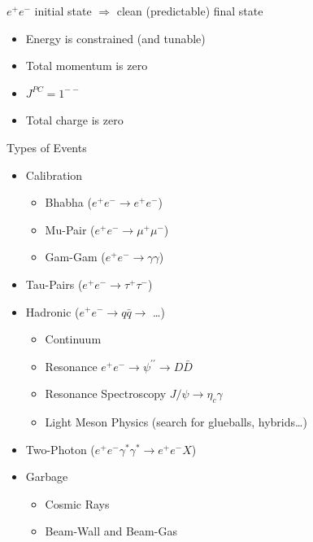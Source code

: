 \begin{slide*}
\slideframe{}
\begin{minipage}[t]{\linewidth}
\vspace{0.2 cm}

\begin{center}
  \begin{minipage}{0.9\linewidth}

    \large
     $e^+ e^-$ initial state $\Longrightarrow$ clean (predictable) final state
     \begin{itemize}
       \item Energy is constrained (and tunable)
       \item Total momentum is zero
       \item $J^{PC} = 1^{--}$
       \item Total charge is zero
     \end{itemize}

    \Large
    \vspace{0.2 cm}
    Types of Events
    \begin{itemize}

      \item Calibration \begin{itemize}
        \item Bhabha ($e^+e^- \to e^+e^-$)
        \item Mu-Pair ($e^+e^- \to \mu^+\mu^-$)
        \item Gam-Gam ($e^+e^- \to \gamma \gamma$)
      \end{itemize}

      \item Tau-Pairs ($e^+e^- \to \tau^+\tau^-$)

      \item Hadronic ($e^+e^- \to q\bar{q} \to$ \ldots) \begin{itemize}
        \item Continuum
        \item Resonance $e^+e^- \to \psi^{\prime\prime} \to D\bar{D}$
        \item Resonance Spectroscopy $J/\psi \to \eta_c \gamma$
        \item Light Meson Physics (search for glueballs, hybrids\ldots)
      \end{itemize}

      \item Two-Photon ($e^+ e^- \gamma^* \gamma^* \to e^+ e^- X$)

      \item Garbage \begin{itemize}
        \item Cosmic Rays
        \item Beam-Wall and Beam-Gas
      \end{itemize}

    \end{itemize}

  \end{minipage}
\end{center}

\end{minipage}
\end{slide*}

